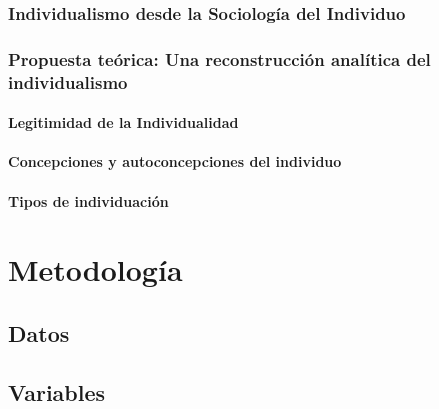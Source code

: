 \documentclass[12pt,twoside]{templates/facsothesis}
\begin{document}
\hypertarget{individualismo-desde-la-sociologuxeda-del-individuo}{%
\subsection{Individualismo desde la Sociología del Individuo}\label{individualismo-desde-la-sociologuxeda-del-individuo}}

\hypertarget{propuesta-teuxf3rica-una-reconstrucciuxf3n-analuxedtica-del-individualismo}{%
\subsection{Propuesta teórica: Una reconstrucción analítica del individualismo}\label{propuesta-teuxf3rica-una-reconstrucciuxf3n-analuxedtica-del-individualismo}}

\hypertarget{legitimidad-de-la-individualidad}{%
\subsubsection{Legitimidad de la Individualidad}\label{legitimidad-de-la-individualidad}}

\hypertarget{concepciones-y-autoconcepciones-del-individuo}{%
\subsubsection{Concepciones y autoconcepciones del individuo}\label{concepciones-y-autoconcepciones-del-individuo}}

\hypertarget{tipos-de-individuaciuxf3n}{%
\subsubsection{Tipos de individuación}\label{tipos-de-individuaciuxf3n}}

\hypertarget{metodologuxeda}{%
\chapter{Metodología}\label{metodologuxeda}}

\hypertarget{datos}{%
\section{Datos}\label{datos}}

\hypertarget{variables}{%
\section{Variables}\label{variables}}
\end{document}
